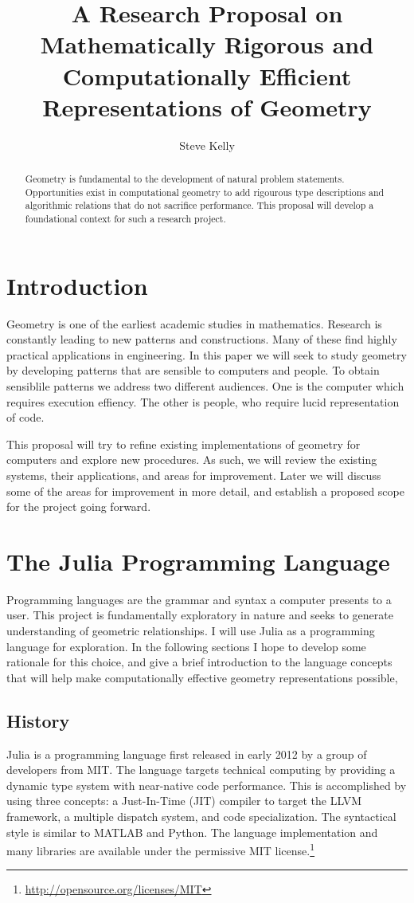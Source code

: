 \documentclass[a4paper]{article}
\title{A Research Proposal on Mathematically Rigorous and Computationally
Efficient Representations of Geometry}
\author{Steve Kelly}
\begin{document}
\maketitle

\begin{abstract}
Geometry is fundamental to the development of natural problem statements.
Opportunities exist in computational geometry to
add rigourous type descriptions and algorithmic relations that do not
sacrifice performance. This proposal will develop a foundational context
for such a research project.
\end{abstract}

\section{Introduction}

Geometry is one of the earliest academic studies in mathematics. Research is
constantly leading to new patterns and constructions. Many of these find
highly practical applications in engineering. In this paper we will seek to
study geometry by developing patterns that are sensible to computers and people.
To obtain sensiblile patterns we address two different audiences.
One is the computer which requires execution effiency. The other is people,
who require lucid representation of code.

This proposal will try to refine existing implementations of geometry for
computers and explore new procedures. As such, we will review the existing
systems, their applications, and areas for improvement. Later we will discuss
some of the areas for improvement in more detail, and establish a proposed
scope for the project going forward.

\section{The Julia Programming Language}

Programming languages are the grammar and syntax a computer presents to a user.
This project is fundamentally exploratory in nature and seeks to generate
understanding of geometric relationships. I will use Julia as a programming
language for exploration. In the following sections I hope to develop some
rationale for this choice, and give a brief introduction to the language
concepts that will help make computationally effective geometry representations
possible,

\subsection{History}
Julia is a programming language first released in early 2012 by a group of
developers from MIT. The language targets technical computing by providing a
dynamic type system with near-native code performance. This is accomplished by
using three concepts: a Just-In-Time (JIT) compiler to target the LLVM framework,
a multiple dispatch system, and code specialization.\cite{bezanson2012julia}
The syntactical style is similar to MATLAB and Python.
The language implementation and many libraries are available under the
permissive MIT license.\footnote{\url{http://opensource.org/licenses/MIT}}
\end{document}
